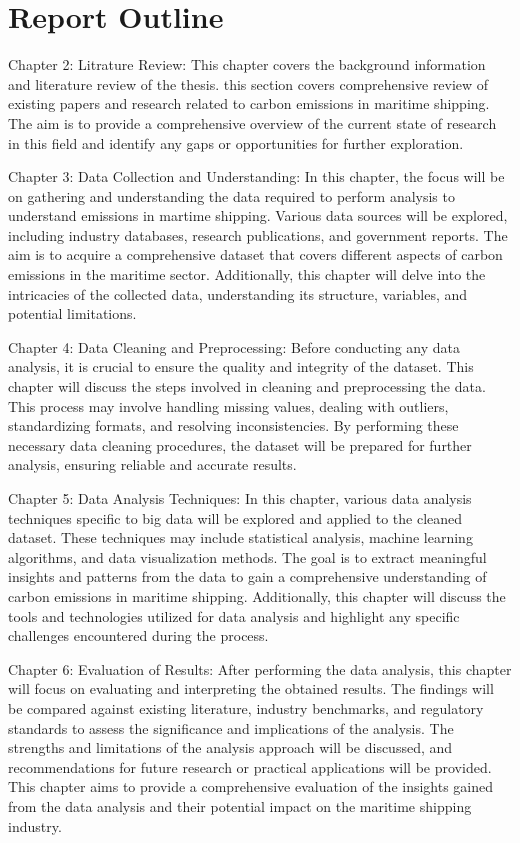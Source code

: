 \section{Report Outline}

\noindent Chapter 2: Litrature Review: This chapter covers the background information and literature review of the thesis.
this section covers comprehensive review of existing papers and research related to carbon emissions in maritime shipping.
The aim is to provide a comprehensive overview of the current state of research in this field and identify any gaps or opportunities for further exploration.


\noindent Chapter 3: Data Collection and Understanding:
In this chapter, the focus will be on gathering and understanding the data required to perform analysis to understand emissions in martime shipping.
Various data sources will be explored, including industry databases, research publications, and government reports.
The aim is to acquire a comprehensive dataset that covers different aspects of carbon emissions in the maritime sector.
Additionally, this chapter will delve into the intricacies of the collected data, understanding its structure, variables, and potential limitations.

\noindent Chapter 4: Data Cleaning and Preprocessing:
Before conducting any data analysis, it is crucial to ensure the quality and integrity of the dataset.
This chapter will discuss the steps involved in cleaning and preprocessing the data.
This process may involve handling missing values, dealing with outliers, standardizing formats, and resolving inconsistencies.
By performing these necessary data cleaning procedures, the dataset will be prepared for further analysis, ensuring reliable and accurate results.

\noindent Chapter 5: Data Analysis Techniques:
In this chapter, various data analysis techniques specific to big data will be explored and applied to the cleaned dataset.
These techniques may include statistical analysis, machine learning algorithms, and data visualization methods.
The goal is to extract meaningful insights and patterns from the data to gain a comprehensive understanding of carbon emissions in maritime shipping.
Additionally, this chapter will discuss the tools and technologies utilized for data analysis and highlight any specific challenges encountered during the process.

\noindent Chapter 6: Evaluation of Results:
After performing the data analysis, this chapter will focus on evaluating and interpreting the obtained results.
The findings will be compared against existing literature, industry benchmarks, and regulatory standards to assess the significance and implications of the analysis.
The strengths and limitations of the analysis approach will be discussed, and recommendations for future research or practical applications will be provided.
This chapter aims to provide a comprehensive evaluation of the insights gained from the data analysis and their potential impact on the maritime shipping industry.

